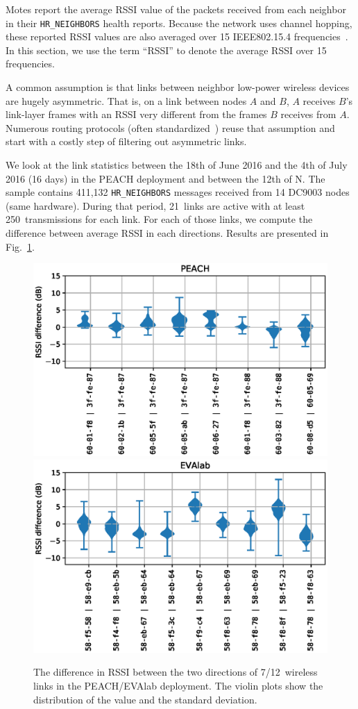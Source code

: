 \documentclass{elsarticle}
\newcommand{\HRNEIGHBORS}         {{\tt HR\_NEIGHBORS}\xspace}
\begin{document}

Motes report the average RSSI value of the packets received from each neighbor in their \HRNEIGHBORS health reports.
Because the network uses channel hopping, these reported RSSI values are also averaged over 15 IEEE802.15.4 frequencies~\cite{std_ieee802154_2011}.
In this section, we use the term ``RSSI'' to denote the average RSSI over 15 frequencies.


A common assumption is that links between neighbor low-power wireless devices are hugely asymmetric.
That is, on a link between nodes $A$ and $B$, $A$ receives $B$'s link-layer frames with an RSSI very different from the frames $B$ receives from $A$.
Numerous routing protocols (often standardized~\cite{rfc3626}) reuse that assumption and start with a costly step of filtering out asymmetric links.


We look at the link statistics between the 18th of June 2016 and the 4th of July 2016 (16 days) in the PEACH deployment and between the 12th of N.
The sample contains 411,132 \HRNEIGHBORS messages received from 14 DC9003 nodes (same hardware).
During that period, 21~links are active with at least 250~transmissions for each link.
For each of those links, we compute the difference between average RSSI in each directions.
Results are presented in Fig.~\ref{fig:tab_symmetry}.

\begin{figure}
    \includegraphics[width=0.5\columnwidth]{asymmetry_peach.eps}
    \includegraphics[width=0.5\columnwidth]{asymmetry.eps}
    \caption{
        The difference in RSSI between the two directions of 7/12~wireless links in the PEACH/EVAlab deployment.
        The violin plots show the distribution of the value and the standard deviation.
    }
    \label{fig:tab_symmetry}
\end{figure}
\end{document}
